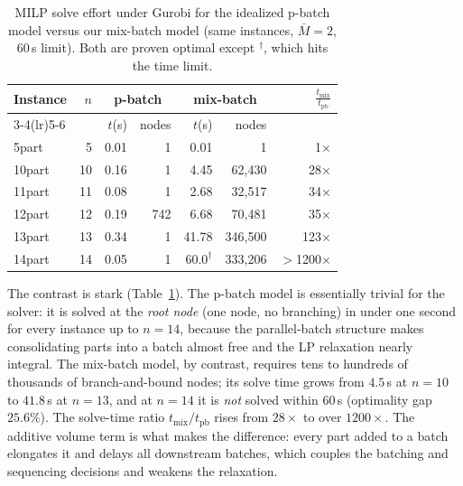 \documentclass[review,3p,times,authoryear]{elsarticle}
\begin{document}
\begin{table}[t]
	\centering
	\caption{MILP solve effort under Gurobi for the idealized p-batch model versus
		our mix-batch model (same instances, $\bar M=2$, $60$\,s limit). Both are
		proven optimal except $^\dagger$, which hits the time limit.}
	\label{tab:milp}
	\small
	\begin{tabular}{l r r r r r r}
		\toprule
		\multirow{2}{*}{Instance} & \multirow{2}{*}{$n$}
		& \multicolumn{2}{c}{p-batch} & \multicolumn{2}{c}{mix-batch} & \multirow{2}{*}{$\frac{t_{\text{mix}}}{t_{\text{pb}}}$} \\
		\cmidrule(lr){3-4}\cmidrule(lr){5-6}
		& & $t$(s) & nodes & $t$(s) & nodes & \\
		\midrule
		5part  & 5  & 0.01 & 1   & 0.01  & 1        & 1$\times$ \\
		10part & 10 & 0.16 & 1   & 4.45  & 62{,}430 & 28$\times$ \\
		11part & 11 & 0.08 & 1   & 2.68  & 32{,}517 & 34$\times$ \\
		12part & 12 & 0.19 & 742 & 6.68  & 70{,}481 & 35$\times$ \\
		13part & 13 & 0.34 & 1   & 41.78 & 346{,}500 & 123$\times$ \\
		14part & 14 & 0.05 & 1   & $60.0^\dagger$ & 333{,}206 & $>$1200$\times$ \\
		\bottomrule
	\end{tabular}
\end{table}

The contrast is stark (Table~\ref{tab:milp}). The p-batch model is essentially
trivial for the solver: it is solved at the \emph{root node} (one node, no
branching) in under one second for every instance up to $n=14$, because the
parallel-batch structure makes consolidating parts into a batch almost free and
the LP relaxation nearly integral. The mix-batch model, by contrast, requires
tens to hundreds of thousands of branch-and-bound nodes; its solve time grows
from $4.5$\,s at $n=10$ to $41.8$\,s at $n=13$, and at $n=14$ it is \emph{not}
solved within $60$\,s (optimality gap $25.6\%$). The solve-time ratio
$t_{\text{mix}}/t_{\text{pb}}$ rises from $28\times$ to over $1200\times$. The
additive volume term is what makes the difference: every part added to a batch
elongates it and delays all downstream batches, which couples the batching and
sequencing decisions and weakens the relaxation.
\end{document}
